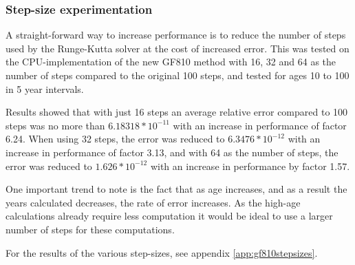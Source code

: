 \subsubsection{Step-size experimentation}
A straight-forward way to increase performance is to reduce the number of steps used by the Runge-Kutta solver at the cost of increased error.
This was tested on the CPU-implementation of the new GF810 method with 16, 32 and 64 as the number of steps compared to the original 100 steps, and tested for ages 10 to 100 in 5 year intervals.

Results showed that with just 16 steps an average relative error compared to 100 steps was no more than $6.18318 * 10^{-11}$ with an increase in performance of factor 6.24.
When using 32 steps, the error was reduced to $6.3476 * 10^{-12}$ with an increase in performance of factor 3.13, and with 64 as the number of steps, the error was reduced to $1.626 * 10^{-12}$ with an increase in performance by factor 1.57.

One important trend to note is the fact that as age increases, and as a result the years calculated decreases, the rate of error increases.
As the high-age calculations already require less computation it would be ideal to use a larger number of steps for these computations.

For the results of the various step-sizes, see appendix \ref{app:gf810stepsizes}.

